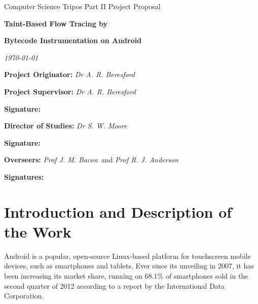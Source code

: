 \documentclass[12pt]{article}
\begin{document}
\thispagestyle{empty}

\medskip
{}
\medskip
{}

\vfil

\centerline{\large Computer Science Tripos Part II Project Proposal}
\vspace{0.4in}
\centerline{\Large\bf Taint-Based Flow Tracing by}
\vspace{0.1in}
\centerline{\Large\bf Bytecode Instrumentation on Android}
\vspace{0.3in}
\cleanlookdateon
\centerline{\large \emph \today}

\vfil

{\bf Project Originator:} \emph{Dr A. R. Beresford}

%

\vspace{0.5in}

{\bf Project Supervisor:} \emph{Dr A. R. Beresford}

\vspace{0.2in}

{\bf Signature:}

\vspace{0.5in}

{\bf Director of Studies:}  \emph{Dr S. W. Moore}

\vspace{0.2in}

{\bf Signature:}

\vspace{0.5in}

{\bf Overseers:} \emph{Prof J. M. Bacon}\ and \emph{Prof R. J. Anderson}

\vspace{0.2in}

{\bf Signatures:} 

\vfil
\eject

\section*{Introduction and Description of the Work}

Android is a popular, open-source Linux-based platform for touchscreen
mobile devices, such as smartphones and tablets. Ever since its unveiling 
in 2007, it has been increasing its market share, running on 68.1\% of 
smartphones sold in the second quarter of 2012 according to a report by 
the International Data Corporation. 
\cite{www.idc.com/getdoc.jsp?containerId=prUS23638712}
\end{document}
